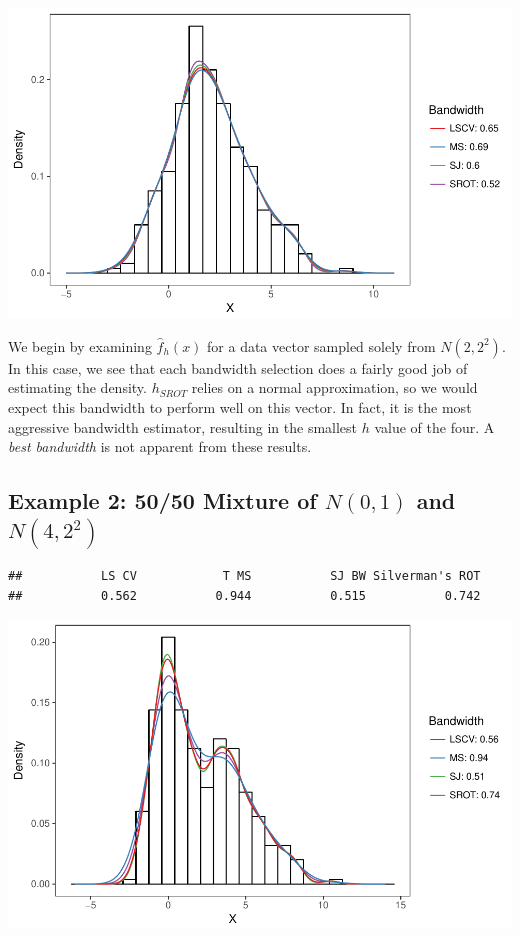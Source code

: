 \documentclass[]{article}
\begin{document}
\begin{center}\includegraphics{FinalReport_files/figure-latex/unnamed-chunk-6-1} \end{center}

We begin by examining \(\widehat{f}_h(x)\) for a data vector sampled
solely from \(N(2, 2^2)\). In this case, we see that each bandwidth
selection does a fairly good job of estimating the density. \(h_{SROT}\)
relies on a normal approximation, so we would expect this bandwidth to
perform well on this vector. In fact, it is the most aggressive
bandwidth estimator, resulting in the smallest \(h\) value of the four.
A \emph{best bandwidth} is not apparent from these results.

\newpage

\subsection{Example 2: 50/50 Mixture of $N(0, 1)$ and $N(4, 2^2)$}

\begin{verbatim}
##           LS CV            T MS           SJ BW Silverman's ROT 
##           0.562           0.944           0.515           0.742
\end{verbatim}

\begin{center}\includegraphics{FinalReport_files/figure-latex/unnamed-chunk-7-1} \end{center}
\end{document}

